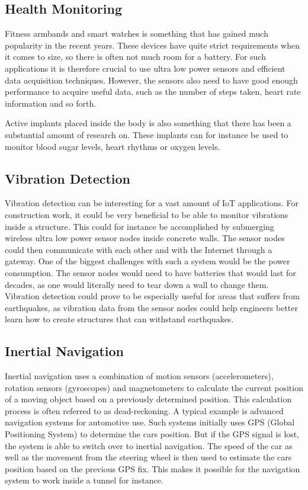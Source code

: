 \subsection{Health Monitoring}

Fitness armbands and smart watches is something that has gained much popularity in the recent years. These devices have quite strict requirements when it comes to size, so there is often not much room for a battery. For such applications it is therefore crucial to use ultra low power sensors and efficient data acquisition techniques. However, the sensors also need to have good enough performance to acquire useful data, such as the number of steps taken, heart rate information and so forth.  

Active implants placed inside the body is also something that there has been a substantial amount of research on. These implants can for instance be used to monitor blood sugar levels, heart rhythms or oxygen levels. 

\subsection{Vibration Detection}

Vibration detection can be interesting for a vast amount of IoT applications. For construction work, it could be very beneficial to be able to monitor vibrations inside a structure. This could for instance be accomplished by submerging wireless ultra low power sensor nodes inside concrete walls. The sensor nodes could then communicate with each other and with the Internet through a gateway. One of the biggest challenges with such a system would be the power consumption. The sensor nodes would need to have batteries that would last for decades, as one would literally need to tear down a wall to change them. Vibration detection could prove to be especially useful for areas that suffers from earthquakes, as vibration data from the sensor nodes could help engineers better learn how to create structures that can withstand earthquakes. 

\subsection{Inertial Navigation}

Inertial navigation uses a combination of motion sensors (accelerometers), rotation sensors (gyroscopes) and magnetometers to calculate the current position of a moving object based on a previously determined position. This calculation process is often referred to as dead-reckoning. A typical example is advanced navigation systems for automotive use. Such systems initially uses GPS (Global Positioning System) to determine the cars position. But if the GPS signal is lost, the system is able to switch over to inertial navigation. The speed of the car as well as the movement from the steering wheel is then used to estimate the cars position based on the previous GPS fix. This makes it possible for the navigation system to work inside a tunnel for instance. 

